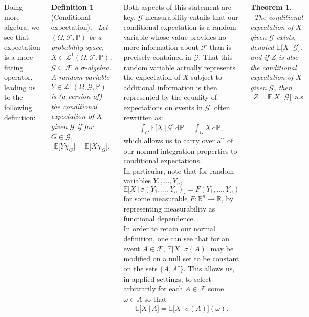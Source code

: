 \documentclass{tikzposter} %
\newtheorem{theorem}{Theorem}
\newtheorem{definition}{Definition}
\begin{document}
\begin{columns}
{    Doing more algebra, we see that expectation is a more fitting operator, leading us to the following definition:
    \begin{definition}[Conditional expectation]
    \ Let $(\Omega, \mathcal{F}, \mathbb{P})$ be a probability space, $X \in \mathcal{L}^{1}(\Omega, \mathcal{F}, \mathbb{P})$, $\mathcal{G} \subseteq \mathcal{F}$ a $\sigma$-algebra. A random variable $Y \in \mathcal{L}^{1}(\Omega, \mathcal{G}, \mathbb{P})$ is (a version of) the conditional expectation of $X$ given $\mathcal{G}$ if for $G \in \mathcal{G}$,
    \begin{align*}
      \mathbb{E}\big[Y \chi_{G}\big] = \mathbb{E}\big[X \chi_{G}\big].
    \end{align*}
    \end{definition}
    Both aspects of this statement are key. $\mathcal{G}$-measurability entails that our conditional expectation is a random variable whose value provides no more information about $\mathcal{F}$ than is precisely contained in $\mathcal{G}$. That this random variable actually represents the expectation of $X$ subject to additional information is then represented by the equality of expectations on events in $\mathcal{G}$, often rewritten as:
    \begin{align*}
      \int_{G} \mathbb{E}\big[X \,|\, \mathcal{G}\big] \, \mathrm{d}\mathbb{P} = \int_{G} X \, \mathrm{d}\mathbb{P},
    \end{align*}
    which allows us to carry over all of our normal integration properties to conditional expectations. \\

    In particular, note that for random variables $Y_{1},\dots,Y_{n}$, $\mathbb{E}\big[X \,|\, \sigma(Y_{1},\dots,Y_{n})\big] = F(Y_{1},\dots,Y_{n})$ for some measurable $F : \mathbb{R}^{n} \to \mathbb{R}$, by representing measurability as functional dependence. \\

    In order to retain our normal definition, one can see that for an event $A \in \mathcal{F}$, $\mathbb{E}\big[X \,|\, \sigma(A)\big]$ may be modified on a null set to be constant on the sets $\{A,A^{c}\}$. This allows us, in applied settings, to select arbitrarily for each $A \in \mathcal{F}$ some $\omega \in A$ so that
    \begin{align*}
      \mathbb{E}\big[X \,|\, A\big] = \mathbb{E}\big[X \,|\, \sigma(A)\big](\omega).
    \end{align*}

    \begin{theorem}
    \ The conditional expectation of $X$ given $\mathcal{G}$ exists, denoted $\mathbb{E}\big[X \,|\, \mathcal{G}\big]$, and if $Z$ is also the conditional expectation of $X$ given $\mathcal{G}$, then
    \begin{align*}
      Z = \mathbb{E}\big[X \,|\, \mathcal{G}\big] \,\,\, \text{a.s.}
    \end{align*}
    \end{theorem}

}
\end{columns}
\end{document}
